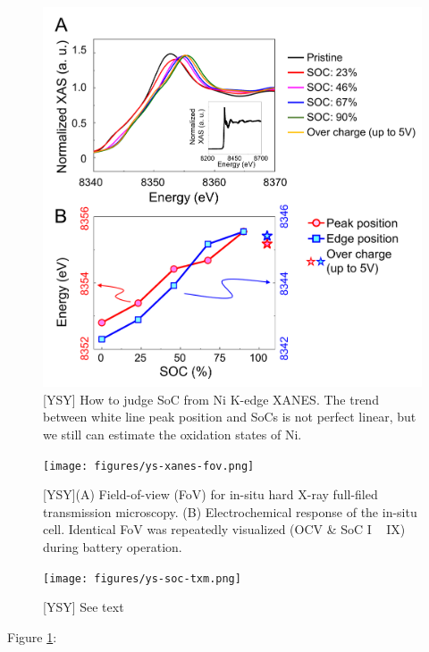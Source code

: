 \documentclass{article}
\begin{document}
\begin{figure}
  \includegraphics[width=\textwidth]{figures/ys-xanes.png}
  \caption{[YSY] How to judge SoC from Ni K-edge XANES. The trend between
    white line peak position and SoCs is not perfect linear, but we
    still can estimate the oxidation states of Ni.}
\end{figure}

\begin{figure}
  \texttt{[image: figures/ys-xanes-fov.png]}
  \caption{[YSY](A) Field-of-view (FoV) for in-situ hard X-ray full-filed
    transmission microscopy. (B) Electrochemical response of the
    in-situ cell. Identical FoV was repeatedly visualized (OCV \& SoC I
    ~ IX) during battery operation.}
\end{figure}

\begin{figure}
  \texttt{[image: figures/ys-soc-txm.png]}
  \caption{[YSY] See text}
  \label{ys-soc-txm}
\end{figure}

Figure \ref{ys-soc-txm}:
\end{document}
